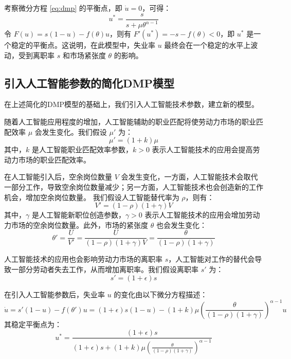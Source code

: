 \documentclass{article}
\begin{document}
考察微分方程 \eqref{eq:dmp} 的平衡点，即 $\dot{u} = 0$，可得：
\begin{equation}
    u^* = \frac{s}{s + \mu \theta^{\alpha-1}}
\end{equation}
令 $F(u) = s(1 - u) - f(\theta) u$，则有 $F'(u^*) = -s - f(\theta) < 0$，即 $u^*$ 是一个稳定的平衡点。这说明，在此模型中，失业率 $u$ 最终会在一个稳定的水平上波动，受到离职率 $s$ 和市场紧张度 $\theta$ 的影响。

\subsection{引入人工智能参数的简化DMP模型}

在上述简化的DMP模型的基础上，我们引入人工智能技术参数，建立新的模型。

随着人工智能应用程度的增加，人工智能辅助的职业匹配将使劳动力市场的职业匹配效率 $\mu$ 会发生变化。我们假设 $\mu'$ 为：
\begin{equation}
    \mu' = (1 + k)\mu
\end{equation}
其中，$k$ 是人工智能职业匹配效率参数，$k > 0$ 表示人工智能技术的应用会提高劳动力市场的职业匹配效率。

在人工智能引入后，空余岗位数量 $V$ 会发生变化，一方面，人工智能技术会取代一部分工作，导致空余岗位数量减少；另一方面，人工智能技术也会创造新的工作机会，增加空余岗位数量。
我们假设人工智能替代率为 $\rho$，则有：
\begin{equation}
    V' = (1 - \rho)(1 + \gamma) V
\end{equation}
其中，$\gamma$ 是人工智能新职位创造参数，$\gamma > 0$ 表示人工智能技术的应用会增加劳动力市场的空余岗位数量。此外，市场的紧张度 $\theta$ 也会发生变化：
\begin{equation}
    \theta' = \frac{U}{V'} = \frac{U}{(1 - \rho)(1 + \gamma) V} = \frac{\theta}{(1 - \rho)(1 + \gamma)}
\end{equation}

人工智能技术的应用也会影响劳动力市场的离职率 $s$，人工智能对工作的替代会导致一部分劳动者失去工作，从而增加离职率。我们假设离职率 $s'$ 为：
\begin{equation}
    s' = (1 + \epsilon)s
\end{equation}

在引入人工智能参数后，失业率 $u$ 的变化由以下微分方程描述：
\begin{equation}
    \dot{u} = s'(1 - u) - f(\theta') u = (1 + \epsilon)s(1 - u) - (1 + k)\mu \left(\frac{\theta}{(1 - \rho)(1 + \gamma)}\right)^{\alpha-1} u 
\end{equation}
其稳定平衡点为：
\begin{equation}
    u^* = \frac{(1 + \epsilon)s}{(1 + \epsilon)s + (1 + k)\mu \left(\frac{\theta}{(1 - \rho)(1 + \gamma)}\right)^{\alpha-1}}
\end{equation}
\end{document}
